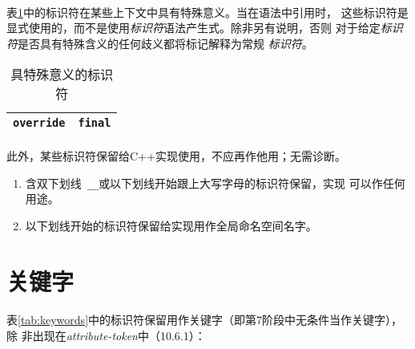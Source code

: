 \paragraph{}
表\ref{tab:special-ids}中的标识符在某些上下文中具有特殊意义。当在语法中引用时，
这些标识符是显式使用的，而不是使用\textit{标识符}语法产生式。除非另有说明，否则
对于给定\textit{标识符}是否具有特殊含义的任何歧义都将标记解释为常规
\textit{标识符}。

\begin{table}[h!]
  \centering
  \caption{具特殊意义的标识符}
  \begin{tabular}{|ll|}
    \hline
    \texttt{override} & \texttt{final} \\
    \hline
  \end{tabular}
  \label{tab:special-ids}
\end{table}

\paragraph{}
此外，某些标识符保留给C++实现使用，不应再作他用；无需诊断。
\begin{enumerate}
  \item{含双下划线\ \texttt{\_\_}或以下划线开始跟上大写字母的标识符保留，实现
    可以作任何用途。}
  \item{以下划线开始的标识符保留给实现用作全局命名空间名字。}
\end{enumerate}

\section{关键字}
\paragraph{}
表\ref{tab:keywords}中的标识符保留用作关键字（即第7阶段中无条件当作关键字），除
非出现在\textit{attribute-token}中（10.6.1）：

